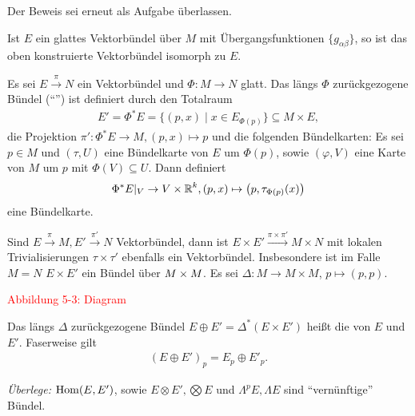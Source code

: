 Der Beweis sei erneut als Aufgabe überlassen.

\begin{kor}
  Ist $E$ ein glattes Vektorbündel über $M$ mit Übergangsfunktionen $\{g_{\alpha\beta}\}$, so ist das oben konstruierte Vektorbündel isomorph zu $E$.
\end{kor}

Es sei $E \xrightarrow{\pi} N$ ein Vektorbündel und $\Phi \colon M \to N$ glatt.
Das längs $\Phi$ zurückgezogene Bündel ("`"') ist definiert durch den Totalraum
\begin{align*}
  E' = \Phi^{\ast}E = \{(p,x) \mid x \in E_{\Phi(p)}\} \subseteq M \times E,
\end{align*}
die Projektion $\pi' \colon \Phi^{\ast}E \to M, (p,x) \mapsto p$ und die folgenden Bündelkarten:
Es sei $p \in M$ und $(\tau, U)$ eine Bündelkarte von $E$ um $\Phi(p)$, sowie $(\varphi,V)$ eine Karte von $M$ um $p$ mit $\Phi(V) \subseteq U$.
Dann definiert 
\begin{align*}
  \Phi^{\ast}E|_V \to V \times \operatorname{\mathbb{R}}^k, (p,x) \mapsto \left(p, \tau_{\Phi(p)}(x)\right)
\end{align*}
eine Bündelkarte.

Sind $E \xrightarrow{\pi} M, E' \xrightarrow{\pi'} N$ Vektorbündel, dann ist $E \times E' \xrightarrow{\pi \times \pi'} M \times N$ mit lokalen Trivialisierungen $\tau \times \tau'$ ebenfalls ein Vektorbündel.
Insbesondere ist im Falle $M = N$ $E \times E'$ ein Bündel über $M \times M$.
Es sei $\Delta \colon M \to M \times M$, $p \mapsto (p,p)$.

\textcolor{red}{Abbildung 5-3: Diagram}

Das längs $\Delta$ zurückgezogene Bündel $E \oplus E' = \Delta^{\ast}(E \times E')$ heißt die  von $E$ und $E'$.
Faserweise gilt
\begin{align*}
  (E \oplus E')_p = E_p \oplus E'_p.
\end{align*}
 
\emph{Überlege:} $\operatorname{Hom}(E,E')$, sowie $E \otimes E', \bigotimes E$ und $\Lambda^pE, \Lambda E$ sind "`vernünftige"' Bündel.


